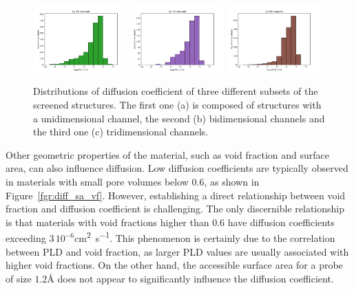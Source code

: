 \documentclass[main]{subfiles}
\begin{document}
\begin{figure}[ht]
  \centering
    \includegraphics[width=0.32\textwidth]{figures/5-diffusion/histogram_chan1D.pdf}
    \includegraphics[width=0.32\textwidth]{figures/5-diffusion/histogram_chan2D.pdf}
    \includegraphics[width=0.32\textwidth]{figures/5-diffusion/histogram_chan3D.pdf}
    \caption{ Distributions of diffusion coefficient of three different subsets of the screened structures. The first one (a) is composed of structures with a unidimensional channel, the second (b) bidimensional channels and the third one (c) tridimensional channels. }\label{fgr:hist_diffusion_chandim}
\end{figure}

Other geometric properties of the material, such as void fraction and surface area, can also influence diffusion. Low diffusion coefficients are typically observed in materials with small pore volumes below $0.6$, as shown in Figure~\ref{fgr:diff_sa_vf}. However, establishing a direct relationship between void fraction and diffusion coefficient is challenging. The only discernible relationship is that materials with void fractions higher than $0.6$ have diffusion coefficients exceeding $3\,10^{-6}$\si{\square\cm\per\s}. This phenomenon is certainly due to the correlation between PLD and void fraction, as larger PLD values are usually associated with higher void fractions. On the other hand, the accessible surface area for a probe of size $1.2$\si{\angstrom} does not appear to significantly influence the diffusion coefficient.
\end{document}
